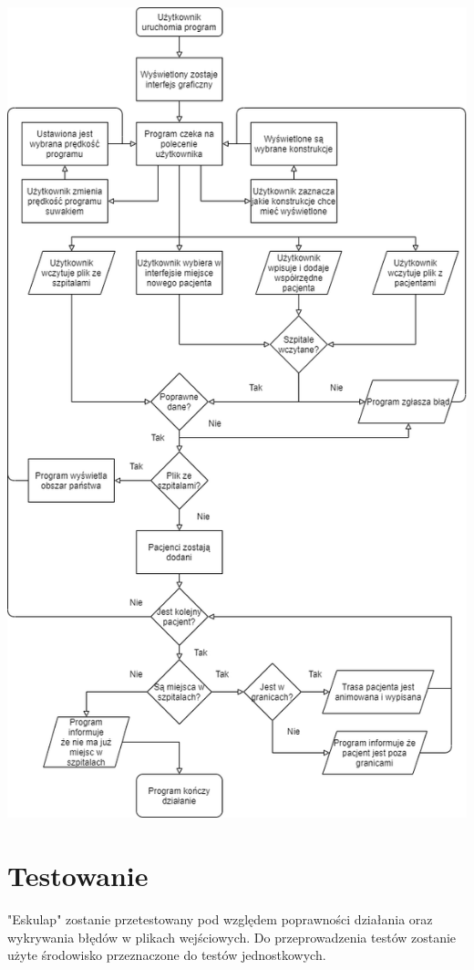 \documentclass[a4paper,12pt,twoside]{article}
\newcommand\nazwa{"Eskulap" }
\begin{document}
\newpage
\includegraphics[width = \textwidth]{UserCase}

\section{Testowanie}
\nazwa zostanie przetestowany pod względem poprawności działania oraz wykrywania błędów w plikach wejściowych. Do przeprowadzenia testów zostanie użyte środowisko przeznaczone do testów jednostkowych.
\end{document}
